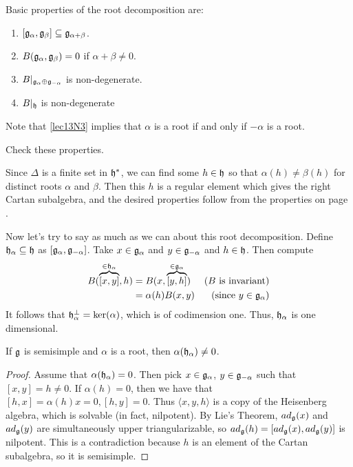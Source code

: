  Basic properties of the root decomposition are:
 \begin{enumerate}
 \item $[\mathfrak{g}_\alpha,\mathfrak{g}_\beta] \subseteq \mathfrak{g}_{\alpha+\beta}$.
 \item $B(\mathfrak{g}_\alpha,\mathfrak{g}_\beta) = 0$ if $\alpha +\beta \neq 0$.
 \item \label{lec13N3} $B|_{\mathfrak{g}_\alpha\oplus \mathfrak{g}_{-\alpha}}$ is non-degenerate.
 \item $B|_{\mathfrak{h}}$ is non-degenerate
 \end{enumerate}
 Note that \ref{lec13N3} implies that $\alpha$ is a root if and only if $-\alpha$ is a
 root.
 \begin{exercise}
   Check these properties.
   \begin{solution}
     Since $\Delta$ is a finite set in $\mathfrak{h}^*$, we can find some $h\in \mathfrak{h}$ so that
     $\alpha(h)\neq \beta(h)$ for distinct roots $\alpha$ and $\beta$. Then this $h$
     is a regular element which gives the right Cartan subalgebra, and the desired
     properties follow from the properties on page \pageref{lec13n1}.
   \end{solution}
 \end{exercise}
 Now let's try to say as much as we can about this root decomposition. Define
 $\mathfrak{h}_\alpha\subseteq \mathfrak{h}$ as $[\mathfrak{g}_\alpha,\mathfrak{g}_{-\alpha}]$. Take $x\in \mathfrak{g}_\alpha$ and $y\in
 \mathfrak{g}_{-\alpha}$ and $h\in \mathfrak{h}$. Then compute
 \begin{align*}
   B(\overbrace{[x,y]}^{\in \mathfrak{h}_\alpha},h) &= B(x,\overbrace{[y,h]}^{\in \mathfrak{g}_\alpha}) & \text{($B$ is invariant)}\\
    &= \alpha(h) B(x,y) & \text{(since $y\in \mathfrak{g}_\alpha$)}
 \end{align*}
 It follows that $\mathfrak{h}_\alpha^\perp=\ker(\alpha)$, which is of codimension one. Thus,
 $\mathfrak{h}_\alpha$ is one dimensional.

 \begin{proposition}
   If $\mathfrak{g}$ is semisimple and $\alpha$ is a root, then $\alpha(\mathfrak{h}_\alpha) \neq 0$.
 \end{proposition}
 \begin{proof}
   Assume that $\alpha(\mathfrak{h}_\alpha)=0$. Then pick $x\in \mathfrak{g}_\alpha$, $y\in \mathfrak{g}_{-\alpha}$
   such that $[x,y]=h\neq 0$. If $\alpha(h)=0$, then we have that
   $[h,x]=\alpha(h)x=0, [h,y]=0$. Thus $\langle x,y,h \rangle$ is a copy of the
   Heisenberg algebra, which is solvable (in fact,
   nilpotent). By Lie's Theorem, $ad_{\mathfrak{g}}(x)$ and $ad_{\mathfrak{g}}(y)$ are simultaneously upper
   triangularizable, so $ad_{\mathfrak{g}}(h)=[ad_{\mathfrak{g}}(x),ad_{\mathfrak{g}}(y)]$ is nilpotent. This is a
   contradiction because $h$ is an element of the Cartan subalgebra, so it is
   semisimple.
 \end{proof}

